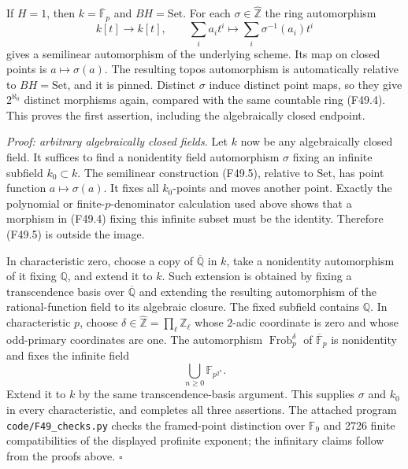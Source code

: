 If $H=1$, then $k=\overline{\mathbb F}_p$ and $BH=\mathrm{Set}$.
For each $\sigma\in\widehat{\mathbb Z}$ the ring automorphism
\[
 k[t]\longrightarrow k[t],\qquad
    \sum_i a_i t^i\longmapsto\sum_i\sigma^{-1}(a_i)t^i
                                                               \tag{F49.5}
\]
gives a semilinear automorphism of the underlying scheme.
Its map on closed points is $a\mapsto\sigma(a)$.
The resulting topos automorphism is automatically relative to
$BH=\mathrm{Set}$, and it is pinned. Distinct $\sigma$ induce
distinct point maps, so they give $2^{\aleph_0}$ distinct morphisms
again, compared with the same countable ring (F49.4). This proves
the first assertion, including the algebraically closed endpoint.

\emph{Proof: arbitrary algebraically closed fields.}
Let $k$ now be any algebraically closed field. It suffices to find
a nonidentity field automorphism $\sigma$ fixing an infinite subfield
$k_0\subset k$. The semilinear construction (F49.5), relative to
$\mathrm{Set}$, has point function $a\mapsto\sigma(a)$. It fixes
all $k_0$-points and moves another point. Exactly the polynomial or
finite-$p$-denominator calculation used above shows that a morphism
in (F49.4) fixing this infinite subset must be the identity.
Therefore (F49.5) is outside the image.

In characteristic zero, choose a copy of $\overline{\mathbb Q}$ in
$k$, take a nonidentity automorphism of it fixing $\mathbb Q$, and
extend it to $k$. Such extension is obtained by fixing a
transcendence basis over $\overline{\mathbb Q}$ and extending the
resulting automorphism of the rational-function field to its
algebraic closure. The fixed subfield contains $\mathbb Q$.
In characteristic $p$, choose
$\delta\in\widehat{\mathbb Z}=\prod_\ell\mathbb Z_\ell$ whose
$2$-adic coordinate is zero and whose odd-primary coordinates are
one. The automorphism $\operatorname{Frob}_p^\delta$ of
$\overline{\mathbb F}_p$ is nonidentity and fixes the infinite field
\[
                    \bigcup_{n\geq0}\mathbb F_{p^{2^n}}.
\]
Extend it to $k$ by the same transcendence-basis argument. This
supplies $\sigma$ and $k_0$ in every characteristic, and completes
all three assertions. The attached program \texttt{code/F49\_checks.py}
checks the framed-point distinction over $\mathbb F_9$ and 2726 finite
compatibilities of the displayed profinite exponent; the infinitary
claims follow from the proofs above. \hfill$\square$
